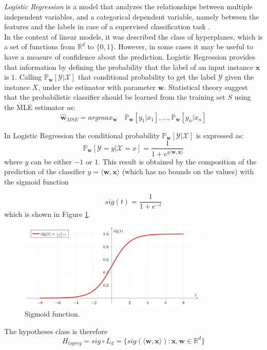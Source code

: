 \textit{Logistic Regression} is a model that analyzes the relationships between multiple independent variables, and a categorical dependent variable, namely between the features and the labels in case of a supervised classification task \cite{article-logreg}.\\
In the context of linear models, it was described the class of hyperplanes, which is a set of functions from $\mathbb{R}^d$ to $\{0,1\}$. However, in some cases it may be useful to have a measure of confidence about the prediction. Logistic Regression provides that information by defining the probability that the label of an input instance $\mathbf{x}$ is $1$. Calling $\mathbb{P}_\mathbf{w}[\mathcal{Y} | \mathcal{X}]$ that conditional probability to get the label $\mathcal{Y}$ given the instance $X$, under the estimator with parameter $\mathbf{w}$. Statistical theory suggest that the probabilistic classifier should be learned from the training set $S$ using the MLE estimator as:
\[ \hat{\mathbf{w}}_{MSE} = argmax_\mathbf{w} \quad \mathbb{P}_\mathbf{w}[y_1 | x_1], \dots , \mathbb{P}_\mathbf{w}[y_n | x_n] \]

In Logistic Regression the conditional probability $\mathbb{P}_\mathbf{w}[\mathcal{Y} | \mathcal{X}]$ is expressed as:
\[ \mathbb{P}_\mathbf{w}[\mathcal{Y}=y | \mathcal{X}=x] = \frac{1}{1 + e^{y \langle \mathbf{w}, \mathbf{x} \rangle}} \]
where $y$ can be either $-1$ or $1$. This result is obtained by the composition of the prediction of the classifier $y = \langle \mathbf{w}, \mathbf{x} \rangle$ (which has no bounds on the values) with the sigmoid function

\[ sig(t) = \frac{1}{1 + e^{-t}} \]
which is shown in Figure \ref{fig:sigmoid}.

\begin{figure}[ht]
	\centering
	\includegraphics[width=0.8\textwidth]{figures/sigmoid.png}
	\caption{Sigmoid function.}
	\label{fig:sigmoid}
\end{figure}

The hypotheses class is therefore
\[ H_{logreg} = sig \circ L_d = \{ sig(\langle \mathbf{w}, \mathbf{x} \rangle) : \mathbf{x}, \mathbf{w} \in \mathbb{R}^d \} \]

